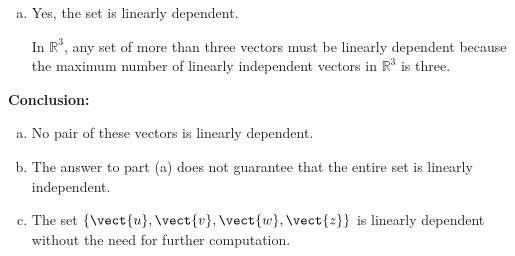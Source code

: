 \begin{solution}
\begin{enumerate}[(a)]
        \item Yes, the set is linearly dependent.
        
        In $\mathbb{R}^3$, any set of more than three vectors must be linearly dependent because the maximum number of linearly independent vectors in $\mathbb{R}^3$ is three.
    \end{enumerate}
        
        
        \textbf{Conclusion:}
        
        \begin{enumerate}[(a)]
            \item No pair of these vectors is linearly dependent.
            \item The answer to part (a) does not guarantee that the entire set is linearly independent.
            \item The set $\{\vect{u}, \vect{v}, \vect{w}, \vect{z}\}$ is linearly dependent without the need for further computation.
        \end{enumerate}

\end{solution}


